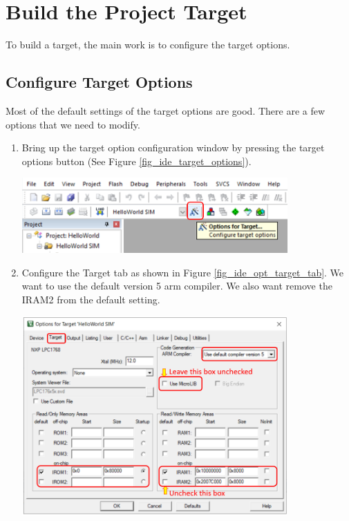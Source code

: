 \section{Build the Project Target}
\label{sec_target_configuration}
To build a target, the main work is to configure the target options.

\subsection{Configure Target Options}
\label{sec_target_option}
Most of the default settings of the target options are good. There are a few options that we need to modify.
  \begin{enumerate}
    \item Bring up the target option configuration window by pressing the target options button (See Figure \ref{fig_ide_target_options}). \par 

      \begin{minipage}{\linewidth}
        \centering
        \includegraphics[width=4in]{figure/uv5/IDE_target_options}
        \label{fig_ide_target_options}
      \end{minipage}

    \item Configure the Target tab as shown in Figure \ref{fig_ide_opt_target_tab}.
      We want to use the default version 5 arm compiler.
      We also want remove the IRAM2 from the default setting. \par 

          \begin{minipage}{\linewidth}
            \centering
            \includegraphics[width=4in]{figure/uv5/IDE_opt_target_tab}
            \label{fig_ide_opt_target_tab}
          \end{minipage}


\end{enumerate}
